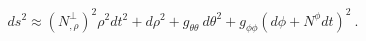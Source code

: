 \begin{equation}
\label{metric}
ds^2 \approx (N^{\perp}_{,\rho})^2 \rho^2 dt^2 + d\rho^2 + g_{\theta\theta}\ d\theta^2
+ g_{\phi\phi}(d\phi+N^{\phi}dt)^2 \ .
\end{equation}

